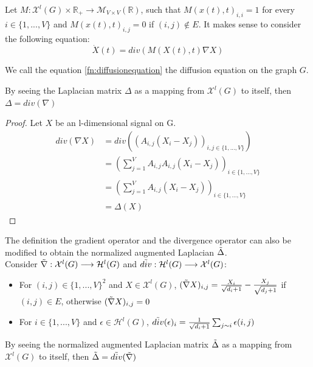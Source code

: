 \documentclass[12pt]{article}
\begin{document}
\noindent Let $M: \mathcal{X}^l(G) \times \mathbb{R}_+ \longrightarrow \mathcal{M}_{V \times V}(\mathbb{R})$, such that $M(x(t),t)_{i,i} = 1$ for every $i \in \{1,...,V\}$ and $M(x(t),t)_{i,j} = 0$ if $(i,j) \not\in E$. It makes sense to consider the following equation:
\begin{equation}\label{fn:diffusionequation}
    \dot{X}(t) = div(M(X(t),t) \nabla X)
\end{equation}

We call the equation \ref{fn:diffusionequation} the diffusion equation on the graph $G$.

\begin{thm}
    By seeing the Laplacian matrix $\Delta$ as a mapping from $\mathcal{X}^l(G)$ to itself, then $\Delta = div(\nabla)$
\end{thm}

\begin{proof}
    Let $X$ be an l-dimensional signal on G.
    \begin{align*}
        div(\nabla X) &= div((A_{i,j}(X_i - X_j))_{i,j \in \{1,...,V\}}) \\
                    &= (\sum_{j=1}^V A_{i,j} A_{i,j}(X_i - X_j))_{i \in \{1,...,V\}} \\
                    &= (\sum_{j=1}^V A_{i,j}(X_i - X_j))_{i \in \{1,...,V\}} \\
                    &= \Delta(X)
    \end{align*}
\end{proof}


The definition the gradient operator and the divergence operator can also be modified to obtain the normalized augmented Laplacian $\Tilde{\Delta}$.\\

Consider $\Tilde{\nabla}: \mathcal{X}^l(G) \longrightarrow \mathcal{H}^l(G)$ and $\Tilde{div}: \mathcal{H}^l(G) \longrightarrow \mathcal{X}^l(G)$:
\begin{itemize}
    \item For $(i,j) \in \{1,...,V\}^2$ and $X \in \mathcal{X}^l(G)$, $(\Tilde{\nabla} X)_{i,j} = \frac{X_i}{\sqrt{d_i+1}} - \frac{X_j}{\sqrt{d_j+1}}$ if $(i,j) \in E$, otherwise $(\Tilde{\nabla} X)_{i,j} = 0$
    \item For $i \in \{1,...,V\}$ and $\epsilon \in \mathcal{H}^l(G)$, $\Tilde{div}(\epsilon)_i = \frac{1}{\sqrt{d_i+1}}\sum_{j \sim i} \epsilon(i,j)$
\end{itemize}

\begin{thm}
     By seeing the normalized augmented Laplacian matrix $\Tilde{\Delta}$ as a mapping from $\mathcal{X}^l(G)$ to itself, then $\Tilde{\Delta} = \Tilde{div}(\Tilde{\nabla})$
\end{thm}
\end{document}
